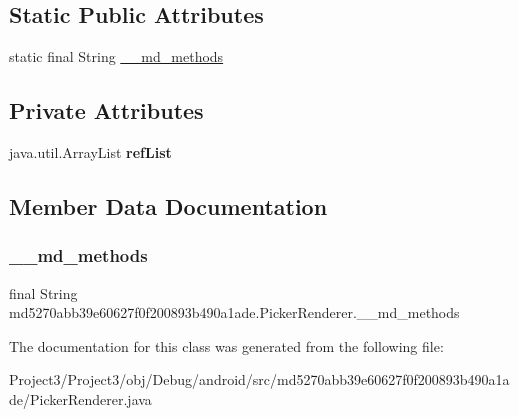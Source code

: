 \subsection*{Static Public Attributes}
\begin{DoxyCompactItemize}
\item 
static final String \hyperlink{classmd5270abb39e60627f0f200893b490a1ade_1_1PickerRenderer_a74038f85b1fb16f11210e480152a004c}{\+\_\+\+\_\+md\+\_\+methods}
\end{DoxyCompactItemize}
\subsection*{Private Attributes}
\begin{DoxyCompactItemize}
\item 
\mbox{\label{classmd5270abb39e60627f0f200893b490a1ade_1_1PickerRenderer_a63b7af8001f6b5d63bc7d868b9d12d4c}} 
java.\+util.\+Array\+List {\bfseries ref\+List}
\end{DoxyCompactItemize}


\subsection{Member Data Documentation}
\mbox{\label{classmd5270abb39e60627f0f200893b490a1ade_1_1PickerRenderer_a74038f85b1fb16f11210e480152a004c}} 
\subsubsection{\texorpdfstring{\+\_\+\+\_\+md\+\_\+methods}{\_\_md\_methods}}
{\footnotesize\ttfamily final String md5270abb39e60627f0f200893b490a1ade.\+Picker\+Renderer.\+\_\+\+\_\+md\+\_\+methods\hspace{0.3cm}{\ttfamily [static]}}



The documentation for this class was generated from the following file\+:\begin{DoxyCompactItemize}
\item 
Project3/\+Project3/obj/\+Debug/android/src/md5270abb39e60627f0f200893b490a1ade/Picker\+Renderer.\+java\end{DoxyCompactItemize}
